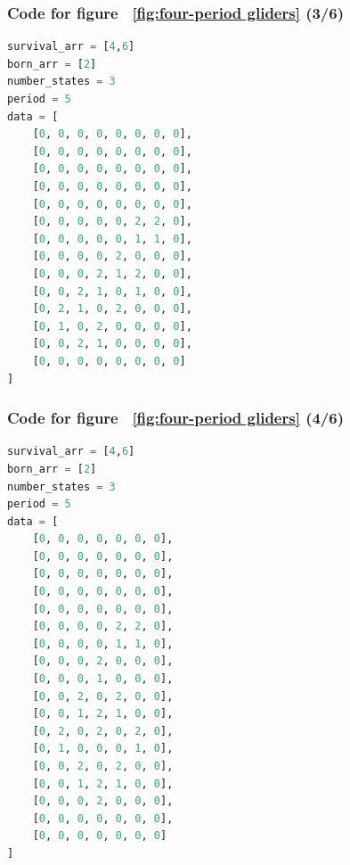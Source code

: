 \documentclass[12pt]{article}
\numberwithin{figure}{section} %
\begin{document}
\noindent\begin{minipage}{.50\textwidth}
\subsubsection{Code for figure ~\ref{fig:four-period gliders} (3/6)}
\label{subsubsection:four-period gliders(3/6)}
\begin{lstlisting}[language = Python]
survival_arr = [4,6]
born_arr = [2]
number_states = 3
period = 5
data = [
    [0, 0, 0, 0, 0, 0, 0, 0],
    [0, 0, 0, 0, 0, 0, 0, 0],
    [0, 0, 0, 0, 0, 0, 0, 0],
    [0, 0, 0, 0, 0, 0, 0, 0],
    [0, 0, 0, 0, 0, 0, 0, 0],
    [0, 0, 0, 0, 0, 2, 2, 0],
    [0, 0, 0, 0, 0, 1, 1, 0],
    [0, 0, 0, 0, 2, 0, 0, 0],
    [0, 0, 0, 2, 1, 2, 0, 0],
    [0, 0, 2, 1, 0, 1, 0, 0],
    [0, 2, 1, 0, 2, 0, 0, 0],
    [0, 1, 0, 2, 0, 0, 0, 0],
    [0, 0, 2, 1, 0, 0, 0, 0],
    [0, 0, 0, 0, 0, 0, 0, 0]
]
\end{lstlisting}
\end{minipage}\hfill
\begin{minipage}{.45\textwidth}
\subsubsection{Code for figure ~\ref{fig:four-period gliders} (4/6)}
\label{subsubsection:four-period gliders(4/6)}
\begin{lstlisting}[language = Python]
survival_arr = [4,6]
born_arr = [2]
number_states = 3
period = 5
data = [
    [0, 0, 0, 0, 0, 0, 0],
    [0, 0, 0, 0, 0, 0, 0],
    [0, 0, 0, 0, 0, 0, 0],
    [0, 0, 0, 0, 0, 0, 0],
    [0, 0, 0, 0, 0, 0, 0],
    [0, 0, 0, 0, 2, 2, 0],
    [0, 0, 0, 0, 1, 1, 0],
    [0, 0, 0, 2, 0, 0, 0],
    [0, 0, 0, 1, 0, 0, 0],
    [0, 0, 2, 0, 2, 0, 0],
    [0, 0, 1, 2, 1, 0, 0],
    [0, 2, 0, 2, 0, 2, 0],
    [0, 1, 0, 0, 0, 1, 0],
    [0, 0, 2, 0, 2, 0, 0],
    [0, 0, 1, 2, 1, 0, 0],
    [0, 0, 0, 2, 0, 0, 0],
    [0, 0, 0, 0, 0, 0, 0],
    [0, 0, 0, 0, 0, 0, 0]
]
\end{lstlisting}
\end{minipage}
\end{document}
